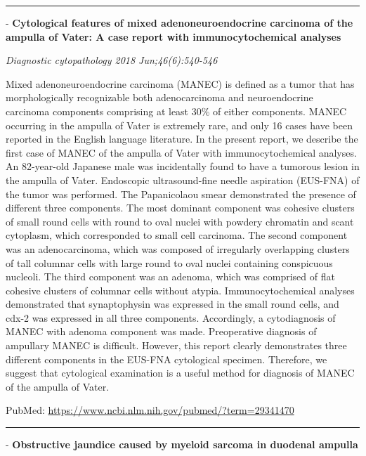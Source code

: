 \documentclass[]{article}
\begin{document}
\begin{center}\rule{0.5\linewidth}{\linethickness}\end{center}

 - \textbf{Cytological features of mixed adenoneuroendocrine carcinoma
of the ampulla of Vater: A case report with immunocytochemical analyses}

\emph{Diagnostic cytopathology 2018 Jun;46(6):540-546}

Mixed adenoneuroendocrine carcinoma (MANEC) is defined as a tumor that
has morphologically recognizable both adenocarcinoma and neuroendocrine
carcinoma components comprising at least 30\% of either components.
MANEC occurring in the ampulla of Vater is extremely rare, and only 16
cases have been reported in the English language literature. In the
present report, we describe the first case of MANEC of the ampulla of
Vater with immunocytochemical analyses. An 82-year-old Japanese male was
incidentally found to have a tumorous lesion in the ampulla of Vater.
Endoscopic ultrasound-fine needle aspiration (EUS-FNA) of the tumor was
performed. The Papanicolaou smear demonstrated the presence of different
three components. The most dominant component was cohesive clusters of
small round cells with round to oval nuclei with powdery chromatin and
scant cytoplasm, which corresponded to small cell carcinoma. The second
component was an adenocarcinoma, which was composed of irregularly
overlapping clusters of tall columnar cells with large round to oval
nuclei containing conspicuous nucleoli. The third component was an
adenoma, which was comprised of flat cohesive clusters of columnar cells
without atypia. Immunocytochemical analyses demonstrated that
synaptophysin was expressed in the small round cells, and cdx-2 was
expressed in all three components. Accordingly, a cytodiagnosis of MANEC
with adenoma component was made. Preoperative diagnosis of ampullary
MANEC is difficult. However, this report clearly demonstrates three
different components in the EUS-FNA cytological specimen. Therefore, we
suggest that cytological examination is a useful method for diagnosis of
MANEC of the ampulla of Vater.

PubMed: \url{https://www.ncbi.nlm.nih.gov/pubmed/?term=29341470}

{}

{}

\begin{center}\rule{0.5\linewidth}{\linethickness}\end{center}

 - \textbf{Obstructive jaundice caused by myeloid sarcoma in duodenal
ampulla}
\end{document}
